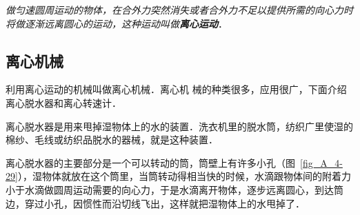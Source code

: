\textit{做匀速圆周运动的物体，在合外力突然消失或者合外力不足以提供所需的向心力时将做逐渐远离圆心的运动，这种运动叫做\textbf{离心运动}}．

\subsection{离心机械}

利用离心运动的机械叫做离心机械．离心机
械的种类很多，应用很广，下面介绍离心脱水器和离心转速计．

离心脱水器是用来甩掉湿物体上的水的装置．洗衣机里的脱水筒，纺织广里使湿的棉纱、毛线或纺织品脱水的器械，就是这种装置．

离心脱水器的主要部分是一个可以转动的筒，筒壁上有许多小孔（图~\ref{fig_A_4-29}），湿物体就放在这个筒里，当筒转动得相当快的时候，水滴跟物体间的附着力小于水滴做圆周运动需要的向心力，于是水滴离开物体，逐步远离圆心，到达筒边，穿过小孔，因惯性而沿切线飞出，这样就把湿物体上的水甩掉了．

